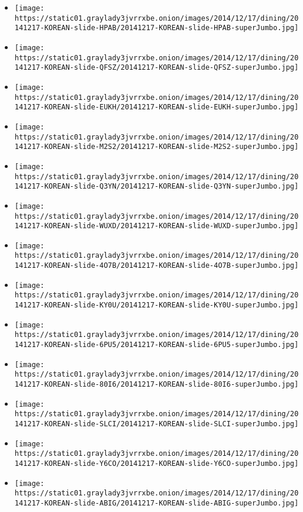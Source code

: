 \begin{itemize}
\item
  \texttt{[image: https://static01.graylady3jvrrxbe.onion/images/2014/12/17/dining/20141217-KOREAN-slide-HPAB/20141217-KOREAN-slide-HPAB-superJumbo.jpg]}
\item
  \texttt{[image: https://static01.graylady3jvrrxbe.onion/images/2014/12/17/dining/20141217-KOREAN-slide-QFSZ/20141217-KOREAN-slide-QFSZ-superJumbo.jpg]}
\item
  \texttt{[image: https://static01.graylady3jvrrxbe.onion/images/2014/12/17/dining/20141217-KOREAN-slide-EUKH/20141217-KOREAN-slide-EUKH-superJumbo.jpg]}
\item
  \texttt{[image: https://static01.graylady3jvrrxbe.onion/images/2014/12/17/dining/20141217-KOREAN-slide-M2S2/20141217-KOREAN-slide-M2S2-superJumbo.jpg]}
\item
  \texttt{[image: https://static01.graylady3jvrrxbe.onion/images/2014/12/17/dining/20141217-KOREAN-slide-Q3YN/20141217-KOREAN-slide-Q3YN-superJumbo.jpg]}
\item
  \texttt{[image: https://static01.graylady3jvrrxbe.onion/images/2014/12/17/dining/20141217-KOREAN-slide-WUXD/20141217-KOREAN-slide-WUXD-superJumbo.jpg]}
\item
  \texttt{[image: https://static01.graylady3jvrrxbe.onion/images/2014/12/17/dining/20141217-KOREAN-slide-4O7B/20141217-KOREAN-slide-4O7B-superJumbo.jpg]}
\item
  \texttt{[image: https://static01.graylady3jvrrxbe.onion/images/2014/12/17/dining/20141217-KOREAN-slide-KY0U/20141217-KOREAN-slide-KY0U-superJumbo.jpg]}
\item
  \texttt{[image: https://static01.graylady3jvrrxbe.onion/images/2014/12/17/dining/20141217-KOREAN-slide-6PU5/20141217-KOREAN-slide-6PU5-superJumbo.jpg]}
\item
  \texttt{[image: https://static01.graylady3jvrrxbe.onion/images/2014/12/17/dining/20141217-KOREAN-slide-80I6/20141217-KOREAN-slide-80I6-superJumbo.jpg]}
\item
  \texttt{[image: https://static01.graylady3jvrrxbe.onion/images/2014/12/17/dining/20141217-KOREAN-slide-SLCI/20141217-KOREAN-slide-SLCI-superJumbo.jpg]}
\item
  \texttt{[image: https://static01.graylady3jvrrxbe.onion/images/2014/12/17/dining/20141217-KOREAN-slide-Y6CO/20141217-KOREAN-slide-Y6CO-superJumbo.jpg]}
\item
  \texttt{[image: https://static01.graylady3jvrrxbe.onion/images/2014/12/17/dining/20141217-KOREAN-slide-ABIG/20141217-KOREAN-slide-ABIG-superJumbo.jpg]}

\end{itemize}
